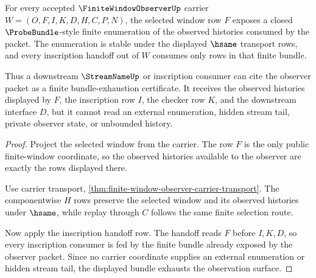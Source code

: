 \begin{theorem}
\label{thm:finite-window-observer-bundle-exhaustion}
For every accepted $\FiniteWindowObserverUp$ carrier $W=(O,F,I,K,D,H,C,P,N)$, the selected window row $F$ exposes a closed $\ProbeBundle$-style finite enumeration of the observed histories consumed by the packet. The enumeration is stable under the displayed $\hsame$ transport rows, and every inscription handoff out of $W$ consumes only rows in that finite bundle.

Thus a downstream $\StreamNameUp$ or inscription consumer can cite the observer packet as a finite bundle-exhaustion certificate. It receives the observed histories displayed by $F$, the inscription row $I$, the checker row $K$, and the downstream interface $D$, but it cannot read an external enumeration, hidden stream tail, private observer state, or unbounded history.
\end{theorem}
\begin{proof}
Project the selected window from the carrier. The row $F$ is the only public finite-window coordinate, so the observed histories available to the observer are exactly the rows displayed there.

Use carrier transport, \autoref{thm:finite-window-observer-carrier-transport}. The componentwise $H$ rows preserve the selected window and its observed histories under $\hsame$, while replay through $C$ follows the same finite selection route.

Now apply the inscription handoff row. The handoff reads $F$ before $I,K,D$, so every inscription consumer is fed by the finite bundle already exposed by the observer packet. Since no carrier coordinate supplies an external enumeration or hidden stream tail, the displayed bundle exhausts the observation surface.
\end{proof}

